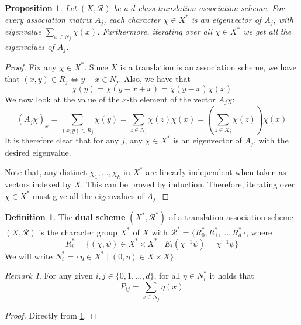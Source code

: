 \documentclass[a4paper,12pt]{article}
\theoremstyle{plain}
\newtheorem{proposition}[theorem]{Proposition}
\theoremstyle{definition}
\newtheorem{definition}[theorem]{Definition}
\theoremstyle{remark}
\newtheorem{remark}[theorem]{Remark}
\begin{document}
\begin{proposition}
    Let $ (X, \mathcal{R}) $ be a $ d $-class translation association scheme. For
    every association matrix $ A_j $, each character $ \chi \in X^* $ is
    an eigenvector of $ A_j $, with eigenvalue
    $ \sum_{ x \in N_j } \chi(x) $. Furthermore, iterating over all
    $ \chi \in X^* $ we get all the eigenvalues of $ A_j $.
    \label{prop:character_eigen}
\end{proposition}
\begin{proof}
    Fix any $ \chi \in X^*  $. Since $ X $ is a translation is an association
    scheme, we have that $ (x,y) \in R_j \iff y-x \in N_j $. Also, we have that
    \[ \chi(y) = \chi(y-x+x) = \chi(y-x)\chi(x) \]
    We now look at the value of the $ x $-th element of the vector $ A_j \chi $:
    \[
        (A_j\chi)_x = \sum_{ (x,y) \in R_j } \chi(y) = \sum_{ z \in N_j }
        \chi(z)\chi(x) = \left ( \sum_{ z \in X_j } \chi(z) \right ) \chi(x)
    \]
    It is therefore clear that for any $ j $, any $ \chi \in X^* $ is an
    eigenvector of $ A_j $, with the desired eigenvalue.

    Note that, any distinct $ \chi_1, \dots, \chi_k $ in $ X^* $ are linearly
    independent when taken as vectors indexed by $ X $. This can be proved by
    induction. Therefore, iterating over $ \chi \in X^* $ must give all the
    eigenvalues of $ A_j $.
\end{proof}

\begin{definition}
    The \textbf{dual scheme} $ (X^*, \mathcal{R}^*) $ of a translation association
    scheme $ (X,\mathcal{R}) $
    is the character group $ X^* $ of $ X $ with
    $ \mathcal{R}^* = \{ R_0^*, R_1^*, \dots, R_d^* \} $, where
    \[ R_i^* = \{ (\chi, \psi) \in X^*\times X^* \mid
    E_i (\chi^{-1}\psi) = \chi^{-1}\psi \} \]
    We will write $ N_i^* = \{ \eta \in X^* \mid (0,\eta) \in X\times X \} $.
\end{definition}

\begin{remark}
    For any given $ i,j \in \{ 0,1,\dots,d \} $, for all
    $ \eta \in N_i^* $ it holds that
    \begin{equation}
        P_{ij} = \sum_{ x \in N_j } \eta(x)
        \label{eq:pval_char_sum}
    \end{equation}
\end{remark}
\begin{proof}
    Directly from \ref{prop:character_eigen}.
\end{proof}
\end{document}
